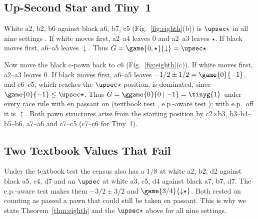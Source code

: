 \subsection{Up-Second Star and Tiny~1}
White a2, b2, b6 against black a6, b7, c5 (Fig.~\ref{fig:eighth}(b)) is $\upsec\star$ in all nine settings
. If white moves first, a2--a4 leaves $0$ and a2--a3 leaves $\star$. If black moves first, a6--a5
leaves ${\downarrow}$. Thus $G=\game{0,\star}{{\downarrow}}=\upsec\star$.

Now move the black c-pawn back to c6 (Fig.~\ref{fig:eighth}(c)). If white moves first, a2--a3 leaves $0$.
If black moves first, a6--a5 leaves $-1/2\pm1/2=\game{0}{-1}$, and c6--c5, which reaches the $\upsec\star$
position, is dominated, since $\game{0}{-1}\le\upsec\star$. Thus $G=\ggame{0}{0\mid -1}=\tinyg{1}$ under
every race rule with en passant on (textbook test , e.p.-aware test ); with e.p.\ off it is
${\uparrow}$. Both pawn structures
arise from the starting position by c2$\times$b3, b3--b4--b5--b6, a7--a6 and c7--c5 (c7--c6 for Tiny~1).

\subsection{Two Textbook Values That Fail}
Under the textbook test the census also has a $1/8$ at white a2, b2, d2 against black a5, c4, d7 and an
$\upsec$ at white a3, c5, d4 against black a7, b7, d7. The e.p.-aware test makes them $-3/2\pm3/2$ and
$\game{3/4}{{\downarrow}\star}$. Both rested on counting as passed a pawn that
could still be taken en passant. This is why we state Theorem~\ref{thm:eighth} and the $\upsec\star$ above for
all nine settings.
